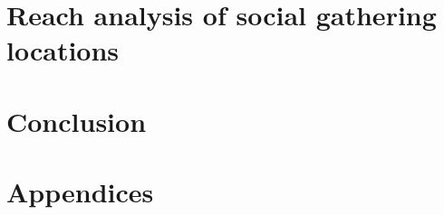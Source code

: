 \documentclass[a4paper, 10pt, openany]{book}
\begin{document}
\chapter{Reach analysis of social gathering locations}\label{chapter_05}



\chapter{Conclusion}

\cleardoublepage


\printbibliography[title={References}] 
\cleardoublepage

\chapter*{Appendices}

\renewcommand{\headrulewidth}{0pt} %
\fancyfoot[C]{\thepage} %
\end{document}
